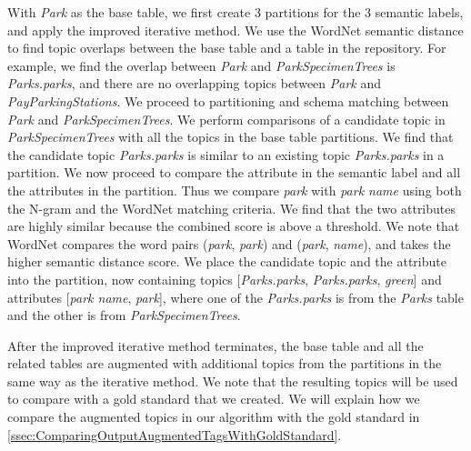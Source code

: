 With \textit{Park} as the base table, we first create 3 partitions for the 3 semantic labels, and apply the improved iterative method. We use the WordNet semantic distance to find topic overlaps between the base table and a table in the repository. For example, we find the overlap between \textit{Park} and \textit{ParkSpecimenTrees} is \textit{Parks.parks}, and there are no overlapping topics between \textit{Park} and \textit{PayParkingStations}. We proceed to partitioning and schema matching between \textit{Park} and \textit{ParkSpecimenTrees}. We perform comparisons of a candidate topic in \textit{ParkSpecimenTrees} with all the topics in the base table partitions. We find that the candidate topic \textit{Parks.parks} is similar to an existing topic \textit{Parks.parks} in a partition. We now proceed to compare the attribute in the semantic label and all the attributes in the partition. Thus we compare \textit{park} with \textit{park name} using both the N-gram and the WordNet matching criteria. We find that the two attributes are highly similar because the combined score is above a threshold. We note that WordNet compares the word pairs (\textit{park}, \textit{park}) and (\textit{park}, \textit{name}), and takes the higher semantic distance score. We place the candidate topic and the attribute into the partition, now containing topics [\textit{Parks.parks}, \textit{Parks.parks}, \textit{green}] and attributes [\textit{park name}, \textit{park}], where one of the \textit{Parks.parks} is from the \textit{Parks} table and the other is from \textit{ParkSpecimenTrees}.

After the improved iterative method terminates, the base table and all the related tables are augmented with additional topics from the partitions in the same way as the iterative method. We note that the resulting topics will be used to compare with a gold standard that we created. We will explain how we compare the augmented topics in our algorithm with the gold standard in \autoref{ssec:ComparingOutputAugmentedTagsWithGoldStandard}.
\endinput